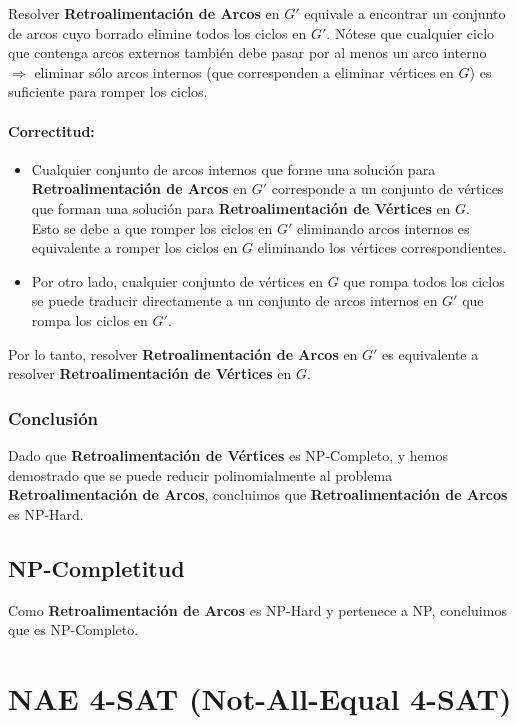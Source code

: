 \documentclass[a4paper,12pt]{article}
\begin{document}
Resolver \textbf{Retroalimentaci\'on de Arcos} en $G'$ equivale a encontrar un conjunto de arcos cuyo borrado elimine todos los ciclos en $G'$. 
Nótese que cualquier ciclo que contenga arcos externos tambi\'en debe pasar por al menos un arco interno $\Rightarrow$ eliminar s\'olo arcos internos (que corresponden a eliminar v\'ertices en $G$) es suficiente para romper los ciclos.

\paragraph{Correctitud:}
\begin{itemize}
    \item Cualquier conjunto de arcos internos que forme una soluci\'on para \textbf{Retroalimentaci\'on de Arcos} en $G'$ corresponde a un conjunto de v\'ertices que forman una soluci\'on para \textbf{Retroalimentaci\'on de V\'ertices} en $G$.\\
    Esto se debe a que romper los ciclos en $G'$ eliminando arcos internos es equivalente a romper los ciclos en $G$ eliminando los v\'ertices correspondientes.
    \item Por otro lado, cualquier conjunto de v\'ertices en $G$ que rompa todos los ciclos se puede traducir directamente a un conjunto de arcos internos en $G'$ que rompa los ciclos en $G'$.
\end{itemize}

Por lo tanto, resolver \textbf{Retroalimentaci\'on de Arcos} en $G'$ es equivalente a resolver \textbf{Retroalimentaci\'on de V\'ertices} en $G$.

\subsubsection{Conclusi\'on}
Dado que \textbf{Retroalimentaci\'on de V\'ertices} es NP-Completo, y hemos demostrado que se puede reducir polinomialmente al problema \textbf{Retroalimentaci\'on de Arcos}, concluimos que \textbf{Retroalimentaci\'on de Arcos} es NP-Hard.

\subsection{NP-Completitud}

Como \textbf{Retroalimentaci\'on de Arcos} es NP-Hard y pertenece a NP, concluimos que es NP-Completo.



\section{NAE 4-SAT (Not-All-Equal 4-SAT)}
\end{document}
